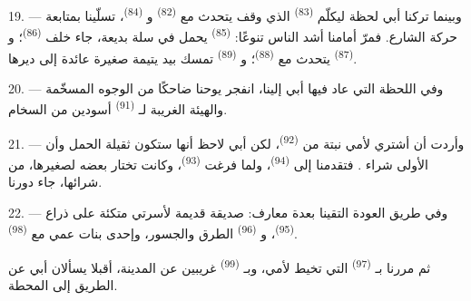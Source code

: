 19. --- وبينما تركنا أبي لحظة ليكلّم  \textsuperscript{(83)}
الذي وقف يتحدث مع  \textsuperscript{(82)} و
\textsuperscript{(84)}، تسلّينا بمتابعة حركة الشارع. فمرّ أمامنا أشد الناس
تنوعًا:  \textsuperscript{(85)} يحمل في سلة 
بديعة، جاء خلف  \textsuperscript{(86)}؛ و \textsuperscript{(87)} يتحدث مع  \textsuperscript{(88)}؛
و \textsuperscript{(89)} تمسك بيد يتيمة صغيرة عائدة إلى ديرها.

\VUsaut{3.0mm}

20. --- وفي اللحظة التي عاد فيها أبي إلينا، انفجر يوحنا ضاحكًا من الوجوه
المسخّمة والهيئة الغريبة لـ \textsuperscript{(91)} أسودين
من السخام.

21. --- وأردت أن أشتري لأمي نبتة من  \textsuperscript{(92)}،
لكن أبي لاحظ أنها ستكون ثقيلة الحمل وأن الأولى شراء .
فتقدمنا إلى  \textsuperscript{(94)}، ولما فرغت
 \textsuperscript{(93)}، وكانت تختار بعضه لصغيرها، من شرائها،
جاء دورنا.

22. --- وفي طريق العودة التقينا بعدة معارف: صديقة قديمة لأسرتي متكئة على
ذراع  \textsuperscript{(95)}، و \textsuperscript{(96)}
الطرق والجسور، وإحدى بنات عمي مع  \textsuperscript{(98)}.

ثم مررنا بـ \textsuperscript{(97)} التي تخيط لأمي، وبـ
\textsuperscript{(99)} غريبين عن المدينة، أقبلا يسألان أبي عن
الطريق إلى المحطة.
\VUsaut{6.0mm}
\VUfilet{22mm}
